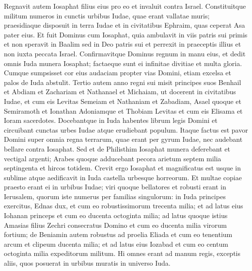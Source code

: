 \begin{biblechapter}
\begin{biblechapter}
\begin{biblechapter}
\begin{biblechapter}
\begin{biblechapter}
\begin{biblechapter}
\begin{biblechapter}
\begin{biblechapter}
\begin{biblechapter}
\begin{biblechapter}
\begin{biblechapter}
\begin{biblechapter}
\begin{biblechapter}
\begin{biblechapter}
\begin{biblechapter}
\begin{biblechapter}
\begin{biblechapter}
\verse Regnavit autem Iosaphat filius eius pro eo et invaluit contra Israel. 
 \verse Constituitque militum numeros in cunctis urbibus Iudae, quae erant vallatae muris; praesidiaque disposuit in terra Iudae et in civitatibus Ephraim, quas ceperat Asa pater eius.
 \verse Et fuit Dominus cum Iosaphat, quia ambulavit in viis patris sui primis et non speravit in Baalim 
\verse sed in Deo patris sui et perrexit in praeceptis illius et non iuxta peccata Israel. 
\verse Confirmavitque Dominus regnum in manu eius, et dedit omnis Iuda munera Iosaphat; factaeque sunt ei infinitae divitiae et multa gloria. 
\verse Cumque sumpsisset cor eius audaciam propter vias Domini, etiam excelsa et palos de Iuda abstulit.
 \verse Tertio autem anno regni sui misit principes suos Benhail et Abdiam et Zachariam et Nathanael et Michaiam, ut docerent in civitatibus Iudae, 
\verse et cum eis Levitas Semeiam et Nathaniam et Zabadiam, Asael quoque et Semiramoth et Ionathan Adoniamque et Thobiam Levitas et cum eis Elisama et Ioram sacerdotes. 
 \verse Docebantque in Iuda habentes librum legis Domini et circuibant cunctas urbes Iudae atque erudiebant populum.
 \verse Itaque factus est pavor Domini super omnia regna terrarum, quae erant per gyrum Iudae, nec audebant bellare contra Iosaphat. 
\verse Sed et de Philisthim Iosaphat munera deferebant et vectigal argenti; Arabes quoque adducebant pecora arietum septem milia septingenta et hircos totidem.
 \verse Crevit ergo Iosaphat et magnificatus est usque in sublime atque aedificavit in Iuda castella urbesque horreorum. 
\verse Et multae copiae praesto erant ei in urbibus Iudae; viri quoque bellatores et robusti erant in Ierusalem, 
\verse quorum iste numerus per familias singulorum: in Iuda principes exercitus, Ednas dux, et cum eo robustissimorum trecenta milia; 
\verse et ad latus eius Iohanan princeps et cum eo ducenta octoginta milia; 
\verse ad latus quoque istius Amasias filius Zechri consecratus Domino et cum eo ducenta milia virorum fortium; 
\verse de Beniamin autem robustus ad proelia Eliada et cum eo tenentium arcum et clipeum ducenta milia; 
\verse et ad latus eius Iozabad et cum eo centum octoginta milia expeditorum militum. 
\verse Hi omnes erant ad manum regis, exceptis aliis, quos posuerat in urbibus muratis in universo Iuda.
 

\end{biblechapter}
\end{biblechapter}
\end{biblechapter}
\end{biblechapter}
\end{biblechapter}
\end{biblechapter}
\end{biblechapter}
\end{biblechapter}
\end{biblechapter}
\end{biblechapter}
\end{biblechapter}
\end{biblechapter}
\end{biblechapter}
\end{biblechapter}
\end{biblechapter}
\end{biblechapter}
\end{biblechapter}
